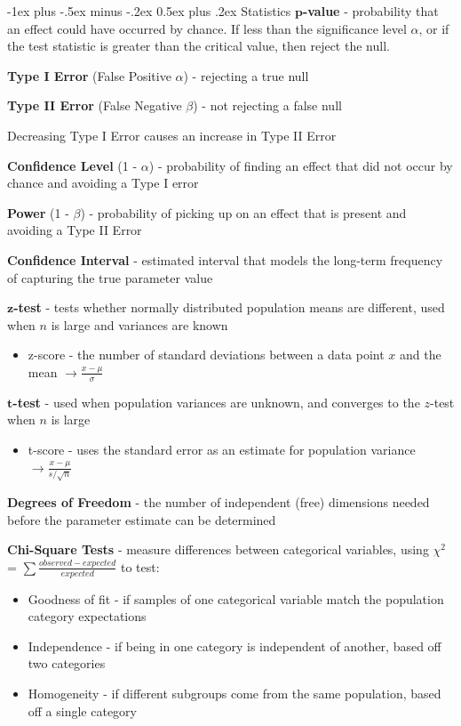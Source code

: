 \documentclass[10pt,landscape]{article}
\makeatletter
\renewcommand{\section}{\@startsection{section}{1}{0mm}%
                                {-1ex plus -.5ex minus -.2ex}%
                                {0.5ex plus .2ex}%
                                {\normalfont\large\bfseries}}
\makeatother
\begin{document}
\begin{multicols}{3}
\section{Statistics}
$\boldsymbol p$\textbf{-value} - probability that an effect could have occurred by chance. If less than the significance level $\alpha$, or if the test statistic is greater than the critical value, then reject the null.

\textbf{Type I Error} (False Positive $\alpha$) - rejecting a true null

\textbf{Type II  Error} (False Negative $\beta$)  - not rejecting a false null

Decreasing Type I Error causes an increase in Type II Error

\textbf{Confidence Level} (1 - $\alpha$) - probability of finding an effect that did not occur by chance and avoiding a Type I error

\textbf{Power} (1 - $\beta$) - probability of picking up on an effect that is present and avoiding a Type II Error

\textbf{Confidence Interval} - estimated interval that models the long-term frequency of capturing the true parameter value

$\boldsymbol{z}$\textbf{-test} - tests whether normally distributed population means are different, used when $n$ is large and variances are known
\vspace{-.5mm}
\begin{itemize}[label={--},leftmargin=4mm]
    \itemsep -.4mm
    \item z-score - the number of standard deviations between a data point $x$ and the mean $\to \frac{x - \mu}{\sigma}$
\end{itemize}
\vspace{-.5mm}
$\boldsymbol{t}$\textbf{-test} - used when population variances are unknown, and converges to the $z$-test when $n$ is large
\vspace{-.5mm}
\begin{itemize}[label={--},leftmargin=4mm]
    \itemsep -.4mm
    \item t-score - uses the standard error as an estimate for population variance $\to \frac{x - \mu}{s/\sqrt{n}}$
\end{itemize}
\vspace{-1mm}
\textbf{Degrees of Freedom} - the number of independent (free) dimensions needed before the parameter estimate can be determined

\textbf{Chi-Square Tests} - measure differences between categorical variables, using $\chi^2$ = $\sum \frac{observed - expected}{expected}$ to test:
\begin{itemize}[label={--},leftmargin=4mm]
    \itemsep -.4mm
    \item Goodness of fit - if samples of one categorical variable match the population category expectations
    \item Independence -  if being in one category is independent of another, based off two categories
    \item Homogeneity - if different subgroups come from the same population, based off a single category
\end{itemize}


\end{multicols}
\end{document}

